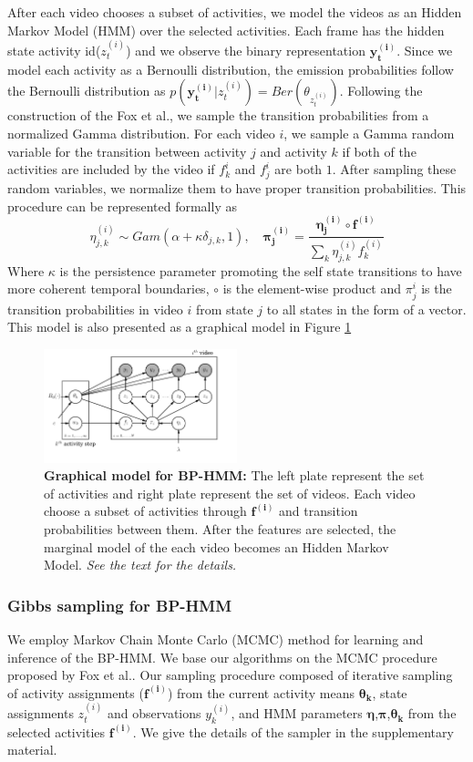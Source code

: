 After each video chooses a subset of activities, we model the videos as an Hidden Markov Model (HMM) over the selected activities. Each frame has the hidden state activity id($z^{(i)}_t$) and we observe the binary representation $\mathbf{y^{(i)}_t}$. Since we model each activity as a Bernoulli distribution, the emission probabilities follow the Bernoulli distribution as $p(\mathbf{y^{(i)}_t}|z^{(i)}_t)=Ber(\theta_{z^{(i)}_t})$. Following the construction of the Fox et al.\cite{foxBPHMM}, we sample the transition probabilities from a normalized Gamma distribution. For each video $i$, we sample a Gamma random variable for the transition between activity $j$ and activity $k$ if both of the activities are included by the video \ie if $f^i_k$ and $f^i_j$ are both $1$. After sampling these random variables, we normalize them to have proper transition probabilities. This procedure can be represented formally as
\begin{equation}
  \eta_{j,k}^{(i)} \sim Gam(\alpha+\kappa \delta_{j,k},1), \quad \mathbf{\pi_j^{(i)}} = \frac{\mathbf{\eta^{(i)}_j} \circ \mathbf{f^{(i)}}}{\sum_k \eta^{(i)}_{j,k} f^{(i)}_k}
\end{equation}
Where $\kappa$ is the persistence parameter promoting the self state transitions to have more coherent temporal boundaries, $\circ$ is the element-wise product and $\pi^i_j$ is the transition probabilities in video $i$ from state $j$ to all states in the form of a vector. This model is also presented as a graphical model in Figure \ref{bphmmo}
\begin{figure}[h!]
  \includegraphics[width=0.5\textwidth]{plate}
  \caption{\textbf{Graphical model for BP-HMM:} The left plate represent the set of activities and right plate represent the set of videos. Each video choose a subset of activities through $\mathbf{f^{(i)}}$ and transition probabilities between them. After the features are selected, the marginal model of the each video becomes an Hidden Markov Model. \emph{See the text for the details.}}
  \label{bphmmo}
\end{figure}


\subsubsection{Gibbs sampling for BP-HMM}
We employ Markov Chain Monte Carlo (MCMC) method for learning and inference of the BP-HMM. We base our algorithms on the MCMC procedure proposed by Fox et al.\cite{foxBPHMM}. Our sampling procedure composed of iterative sampling of activity assignments ($\mathbf{f^{(i)}}$) from the current activity means $\mathbf{\theta_k}$, state assignments $z^{(i)}_t$ and observations $y^{(i)}_k$, and HMM parameters $\mathbf{\eta}$,$\mathbf{\pi}$,$\mathbf{\theta_k}$ from the selected activities $\mathbf{f^{(i)}}$. We give the details of the sampler in the supplementary material.